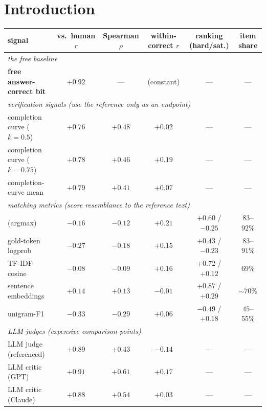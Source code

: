 \section{Introduction}
\label{sec:intro}

\begin{table}[t!]
\centering
\small
\setlength{\tabcolsep}{4pt}
\begin{tabular}{lccccc}
\toprule
signal & vs.\ human $r$ & Spearman $\rho$ & within-correct $r$ & ranking (hard/sat.) & item share \\
\midrule
\multicolumn{6}{l}{\emph{\footnotesize the free baseline}} \\
\textbf{free answer-correct bit} & $\mathbf{+0.92}$ & --- & (constant) & --- & --- \\
\midrule
\multicolumn{6}{l}{\emph{\footnotesize verification signals (use the reference only as an endpoint)}} \\
completion curve ($k{=}0.5$) & $+0.76$ & $+0.48$ & $+0.02$ & --- & --- \\
completion curve ($k{=}0.75$) & $+0.78$ & $+0.46$ & $+0.19$ & --- & --- \\
completion-curve mean & $+0.79$ & $+0.41$ & $+0.07$ & --- & --- \\
\midrule
\multicolumn{6}{l}{\emph{\footnotesize matching metrics (score resemblance to the reference text)}} \\
\tfa{} (argmax) & $-0.16$ & $-0.12$ & $+0.21$ & $+0.60$ / $-0.25$ & $83$--$92\%$ \\
gold-token logprob & $-0.27$ & $-0.18$ & $+0.15$ & $+0.43$ / $-0.23$ & $83$--$91\%$ \\
TF-IDF cosine & $-0.08$ & $-0.09$ & $+0.16$ & $+0.72$ / $+0.12$ & $69\%$ \\
sentence embeddings & $\mathbf{+0.14}$ & $+0.13$ & $-0.01$ & $+0.87$ / $+0.29$ & $\sim$$70\%$ \\
unigram-F1 & $\mathbf{-0.33}$ & $-0.29$ & $+0.06$ & $-0.49$ / $+0.18$ & $45$--$55\%$ \\
\midrule
\multicolumn{6}{l}{\emph{\footnotesize LLM judges (expensive comparison points)}} \\
LLM judge (referenced) & $+0.89$ & $+0.43$ & $-0.14$ & --- & --- \\
LLM critic (GPT) & $+0.91$ & $+0.61$ & $+0.17$ & --- & --- \\
LLM critic (Claude) & $+0.88$ & $+0.54$ & $+0.03$ & --- & --- \\
\bottomrule
\end{tabular}

\end{table}
